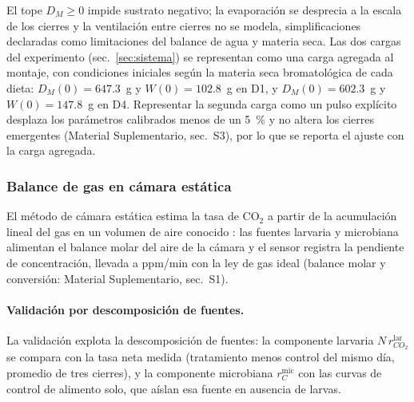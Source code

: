 El tope $D_M \geq 0$ impide sustrato negativo; la evaporación se desprecia a la escala de los cierres y la ventilación entre cierres no se modela, simplificaciones declaradas como limitaciones del balance de agua y materia seca. Las dos cargas del experimento (sec.~\ref{sec:sistema}) se representan como una carga agregada al montaje, con condiciones iniciales según la materia seca bromatológica de cada dieta: $D_M(0) = 647.3$~g y $W(0) = 102.8$~g en D1, y $D_M(0) = 602.3$~g y $W(0) = 147.8$~g en D4. Representar la segunda carga como un pulso explícito desplaza los parámetros calibrados menos de un 5~\% y no altera los cierres emergentes (Material Suplementario, sec.~S3), por lo que se reporta el ajuste con la carga agregada.

\subsubsection{Balance de gas en cámara estática}

El método de cámara estática estima la tasa de CO$_2$ a partir de la acumulación lineal del gas en un volumen de aire conocido \parencite{hutchinsonMethodsSoilAnalysis1992}: las fuentes larvaria y microbiana alimentan el balance molar del aire de la cámara y el sensor registra la pendiente de concentración, llevada a ppm/min con la ley de gas ideal (balance molar y conversión: Material Suplementario, sec.~S1).

\paragraph{Validación por descomposición de fuentes.}
La validación explota la descomposición de fuentes: la componente larvaria $N\,r_{CO_2}^{\mathrm{lar}}$ se compara con la tasa neta medida (tratamiento menos control del mismo día, promedio de tres cierres), y la componente microbiana $r_C^{\mathrm{mic}}$ con las curvas de control de alimento solo, que aíslan esa fuente en ausencia de larvas.

